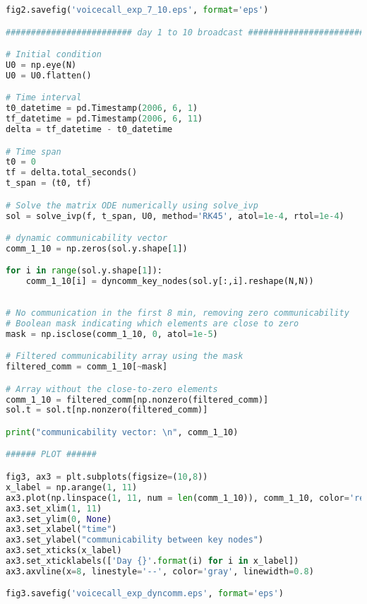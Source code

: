 \begin{lstlisting}[language=Python, caption=Voice call experiment]
fig2.savefig('voicecall_exp_7_10.eps', format='eps')

######################### day 1 to 10 broadcast #########################

# Initial condition 
U0 = np.eye(N)
U0 = U0.flatten()

# Time interval 
t0_datetime = pd.Timestamp(2006, 6, 1)
tf_datetime = pd.Timestamp(2006, 6, 11)
delta = tf_datetime - t0_datetime

# Time span
t0 = 0
tf = delta.total_seconds() 
t_span = (t0, tf) 

# Solve the matrix ODE numerically using solve_ivp
sol = solve_ivp(f, t_span, U0, method='RK45', atol=1e-4, rtol=1e-4)

# dynamic communicability vector
comm_1_10 = np.zeros(sol.y.shape[1])

for i in range(sol.y.shape[1]):
    comm_1_10[i] = dyncomm_key_nodes(sol.y[:,i].reshape(N,N))
    
    
# No communication in the first 8 min, removing zero communicability
# Boolean mask indicating which elements are close to zero
mask = np.isclose(comm_1_10, 0, atol=1e-5)

# Filtered communicability array using the mask
filtered_comm = comm_1_10[~mask]

# Array without the close-to-zero elements
comm_1_10 = filtered_comm[np.nonzero(filtered_comm)]
sol.t = sol.t[np.nonzero(filtered_comm)]

print("communicability vector: \n", comm_1_10)

###### PLOT ######

fig3, ax3 = plt.subplots(figsize=(10,8))
x_label = np.arange(1, 11)
ax3.plot(np.linspace(1, 11, num = len(comm_1_10)), comm_1_10, color='red')
ax3.set_xlim(1, 11)
ax3.set_ylim(0, None)
ax3.set_xlabel("time")
ax3.set_ylabel("communicability between key nodes")
ax3.set_xticks(x_label)
ax3.set_xticklabels(['Day {}'.format(i) for i in x_label])
ax3.axvline(x=8, linestyle='--', color='gray', linewidth=0.8)

fig3.savefig('voicecall_exp_dyncomm.eps', format='eps')
\end{lstlisting}

